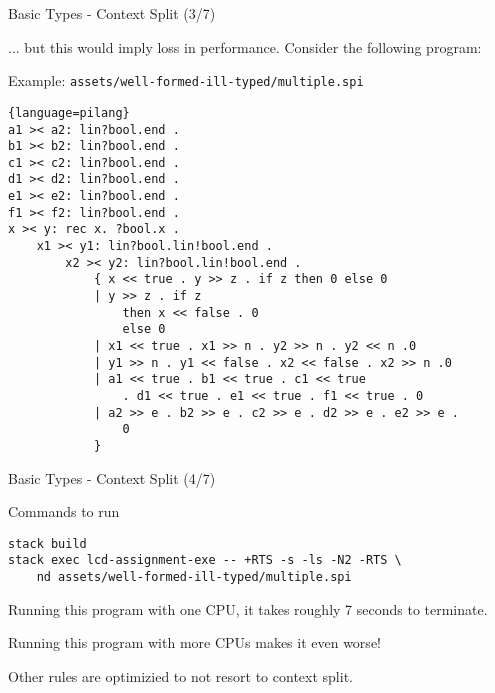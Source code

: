 \begin{frame}[fragile]{Basic Types - Context Split (3/7)}
    
    ... but this would imply loss in performance. Consider the following program:
    \begin{exampleblock}{Example: \texttt{assets/well-formed-ill-typed/multiple.spi}}
\tiny\begin{lstlisting}{language=pilang}
a1 >< a2: lin?bool.end .
b1 >< b2: lin?bool.end .
c1 >< c2: lin?bool.end .
d1 >< d2: lin?bool.end .
e1 >< e2: lin?bool.end .
f1 >< f2: lin?bool.end .
x >< y: rec x. ?bool.x .
    x1 >< y1: lin?bool.lin!bool.end .
        x2 >< y2: lin?bool.lin!bool.end .
            { x << true . y >> z . if z then 0 else 0
            | y >> z . if z
                then x << false . 0
                else 0
            | x1 << true . x1 >> n . y2 >> n . y2 << n .0
            | y1 >> n . y1 << false . x2 << false . x2 >> n .0
            | a1 << true . b1 << true . c1 << true 
                . d1 << true . e1 << true . f1 << true . 0
            | a2 >> e . b2 >> e . c2 >> e . d2 >> e . e2 >> e . 
                0
            }
        \end{lstlisting}
    \end{exampleblock}
\end{frame}

\begin{frame}[fragile]{Basic Types - Context Split (4/7)}
    
    \begin{block}{Commands to run}
        \small\begin{verbatim}
stack build
stack exec lcd-assignment-exe -- +RTS -s -ls -N2 -RTS \
    nd assets/well-formed-ill-typed/multiple.spi
        \end{verbatim}
    \end{block}
    Running this program with one CPU, it takes roughly 7 seconds to terminate.
    \vspace{0.5cm}

    Running this program with more CPUs makes it even worse!

    \vspace{0.5cm}

    Other rules are optimizied to not resort to context split.
\end{frame}

